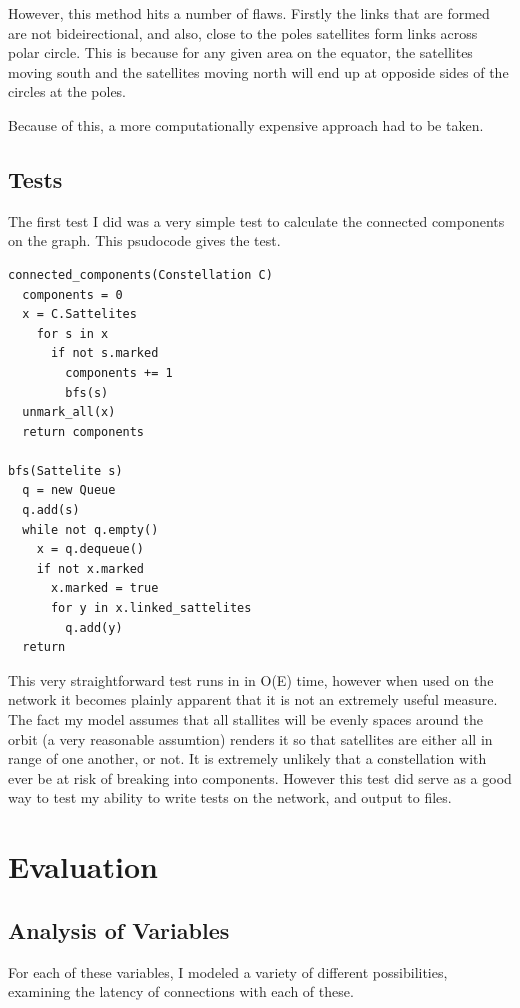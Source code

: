 \documentclass[12pt]{article}
\begin{document}
However, this method hits a number of flaws. Firstly the links that are formed are not bideirectional, and also, close to the poles satellites form links across polar circle. This is because for any given area on the equator, the satellites moving south and the satellites moving north will end up at opposide sides of the circles at the poles.


Because of this, a more computationally expensive approach had to be taken.


\subsection{Tests}

The first test I did was a very simple test to calculate the connected components on the graph. This psudocode gives the test.

\begin{lstlisting}
connected_components(Constellation C)
  components = 0
  x = C.Sattelites
    for s in x
      if not s.marked
        components += 1
        bfs(s)
  unmark_all(x)
  return components

bfs(Sattelite s)
  q = new Queue
  q.add(s)
  while not q.empty()
    x = q.dequeue()
    if not x.marked
      x.marked = true
      for y in x.linked_sattelites
        q.add(y)
  return			
\end{lstlisting}

This very straightforward test runs in in O(E) time, however when used on the network it becomes plainly apparent that it is not an extremely useful measure. The fact my model assumes that all stallites will be evenly spaces around the orbit (a very reasonable assumtion) renders it so that satellites are either all in range of one another, or not. It is extremely unlikely that a constellation with ever be at risk of breaking into components. However this test did serve as a good way to test my ability to write tests on the network, and output to files.

\section{Evaluation}

\subsection{Analysis of Variables}
For each of these variables, I modeled a variety of different possibilities, examining the latency of connections with each of these.
\end{document}
